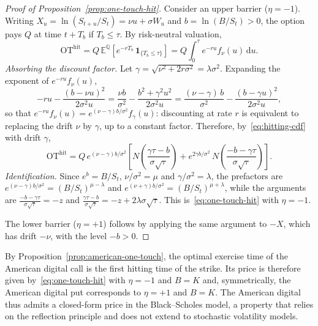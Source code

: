 \documentclass[11pt,a4paper]{article}
\theoremstyle{remark}
\begin{document}
\begin{proof}[Proof of Proposition~\ref{prop:one-touch-hit}]
Consider an upper barrier ($\eta = -1$). Writing
$X_u = \ln(S_{t+u}/S_t) = \nu u + \sigma W_u$ and $b = \ln(B/S_t) > 0$, the
option pays $Q$ at time $t + T_b$ if $T_b \leq \tau$. By risk-neutral
valuation,
\begin{equation*}
  \mathrm{OT}^{\mathrm{hit}}
  = Q\,\mathbb{E}^{\mathbb{Q}}\!\left[e^{-r T_b}\,\mathbf{1}_{\{T_b \leq \tau\}}\right]
  = Q \int_0^{\tau} e^{-ru} f_{\nu}(u)\,\mathrm{d}u .
\end{equation*}
\emph{Absorbing the discount factor.} Let $\gamma = \sqrt{\nu^2 + 2r\sigma^2} = \lambda\sigma^2$.
Expanding the exponent of $e^{-ru} f_{\nu}(u)$,
\begin{equation*}
  -ru - \frac{(b - \nu u)^2}{2\sigma^2 u}
  = \frac{\nu b}{\sigma^2} - \frac{b^2 + \gamma^2 u^2}{2\sigma^2 u}
  = \frac{(\nu - \gamma)\, b}{\sigma^2} - \frac{(b - \gamma u)^2}{2\sigma^2 u},
\end{equation*}
so that $e^{-ru} f_{\nu}(u) = e^{(\nu - \gamma) b/\sigma^2} f_{\gamma}(u)$:
discounting at rate $r$ is equivalent to replacing the drift $\nu$ by
$\gamma$, up to a constant factor. Therefore, by~\eqref{eq:hitting-cdf} with
drift $\gamma$,
\begin{equation*}
  \mathrm{OT}^{\mathrm{hit}}
  = Q\, e^{(\nu - \gamma) b/\sigma^2}
    \left[ N\!\left(\frac{\gamma\tau - b}{\sigma\sqrt{\tau}}\right)
    + e^{2\gamma b/\sigma^2}\, N\!\left(\frac{-b - \gamma\tau}{\sigma\sqrt{\tau}}\right) \right].
\end{equation*}
\emph{Identification.} Since $e^{b} = B/S_t$, $\nu/\sigma^2 = \mu$ and
$\gamma/\sigma^2 = \lambda$, the prefactors are
$e^{(\nu-\gamma)b/\sigma^2} = (B/S_t)^{\mu - \lambda}$ and
$e^{(\nu+\gamma)b/\sigma^2} = (B/S_t)^{\mu + \lambda}$, while the arguments are
$\frac{-b - \gamma\tau}{\sigma\sqrt{\tau}} = -z$ and
$\frac{\gamma\tau - b}{\sigma\sqrt{\tau}} = -z + 2\lambda\sigma\sqrt{\tau}$.
This is~\eqref{eq:one-touch-hit} with $\eta = -1$.

The lower barrier ($\eta = +1$) follows by applying the same argument to $-X$,
which has drift $-\nu$, with the level $-b > 0$.
\end{proof}

By Proposition~\ref{prop:american-one-touch}, the optimal exercise time of the
American digital call is the first hitting time of the strike. Its price is
therefore given by~\eqref{eq:one-touch-hit} with $\eta = -1$ and $B = K$ and,
symmetrically, the American digital put corresponds to $\eta = +1$ and $B = K$.
The American digital thus admits a closed-form price in the Black--Scholes
model, a property that relies on the reflection principle and does not extend
to stochastic volatility models.
\end{document}
